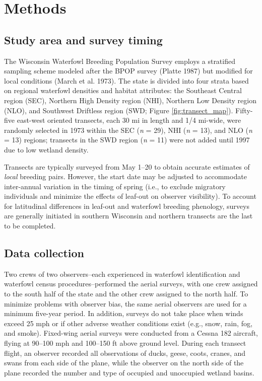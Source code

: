 \documentclass[
  12pt,
]{article}
\begin{document}
\hypertarget{methods}{%
\section{Methods}\label{methods}}

\hypertarget{study-area-and-survey-timing}{%
\subsection{Study area and survey
timing}\label{study-area-and-survey-timing}}

The Wisconsin Waterfowl Breeding Population Survey employs a stratified
sampling scheme modeled after the BPOP survey (Platte 1987) but modified
for local conditions (March et al. 1973). The state is divided into four
strata based on regional waterfowl densities and habitat attributes: the
Southeast Central region (SEC), Northern High Density region (NHI),
Northern Low Density region (NLO), and Southwest Driftless region (SWD;
Figure \ref{fig:transect_map}). Fifty-five east-west oriented transects,
each 30 mi in length and 1/4 mi-wide, were randomly selected in 1973
within the SEC (\emph{n} = 29), NHI (\emph{n} = 13), and NLO (\emph{n} =
13) regions; transects in the SWD region (\emph{n} = 11) were not added
until 1997 due to low wetland density.

Transects are typically surveyed from May 1--20 to obtain accurate
estimates of \emph{local} breeding pairs. However, the start date may be
adjusted to accommodate inter-annual variation in the timing of spring
(i.e., to exclude migratory individuals and minimize the effects of
leaf-out on observer visibility). To account for latitudinal differences
in leaf-out and waterfowl breeding phenology, surveys are generally
initiated in southern Wisconsin and northern transects are the last to
be completed.

\hypertarget{data-collection}{%
\subsection{Data collection}\label{data-collection}}

Two crews of two observers--each experienced in waterfowl identification
and waterfowl census procedures--performed the aerial surveys, with one
crew assigned to the south half of the state and the other crew assigned
to the north half. To minimize problems with observer bias, the same
aerial observers are used for a minimum five-year period. In addition,
surveys do not take place when winds exceed 25 mph or if other adverse
weather conditions exist (e.g., snow, rain, fog, and smoke). Fixed-wing
aerial surveys were conducted from a Cessna 182 aircraft, flying at
90--100 mph and 100--150 ft above ground level. During each transect
flight, an observer recorded all observations of ducks, geese, coots,
cranes, and swans from each side of the plane, while the observer on the
north side of the plane recorded the number and type of occupied and
unoccupied wetland basins.
\end{document}
